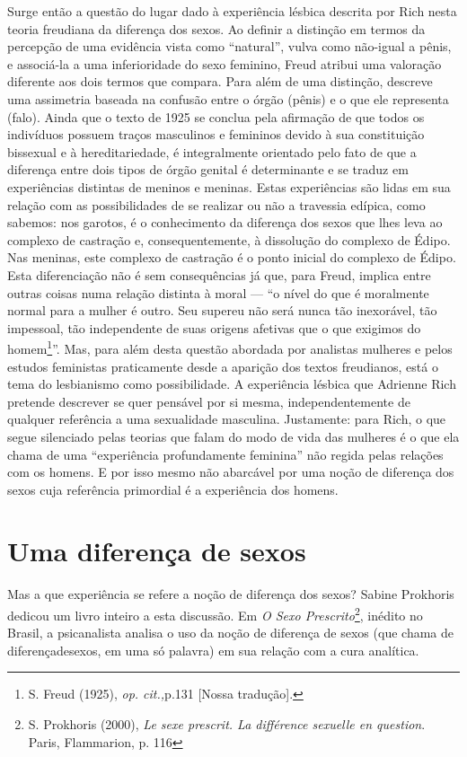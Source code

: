Surge então a questão do lugar dado à experiência lésbica descrita por
Rich nesta teoria freudiana da diferença dos sexos. Ao definir a
distinção em termos da percepção de uma evidência vista como
``natural'', vulva como não-igual a pênis, e associá-la a uma
inferioridade do sexo feminino, Freud atribui uma valoração diferente
aos dois termos que compara. Para além de uma distinção, descreve uma
assimetria baseada na confusão entre o órgão (pênis) e o que ele
representa (falo). Ainda que o texto de 1925 se conclua pela afirmação
de que todos os indivíduos possuem traços masculinos e femininos devido
à sua constituição bissexual e à hereditariedade, é integralmente
orientado pelo fato de que a diferença entre dois tipos de órgão genital
é determinante e se traduz em experiências distintas de meninos e
meninas. Estas experiências são lidas em sua relação com as
possibilidades de se realizar ou não a travessia edípica, como sabemos:
nos garotos, é o conhecimento da diferença dos sexos que lhes leva ao
complexo de castração e, consequentemente, à dissolução do complexo de
Édipo. Nas meninas, este complexo de castração é o ponto inicial do
complexo de Édipo. Esta diferenciação não é sem consequências já que,
para Freud, implica entre outras coisas numa relação distinta à moral ---
``o nível do que é moralmente normal para a mulher é outro. Seu supereu
não será nunca tão inexorável, tão impessoal, tão independente de suas
origens afetivas que o que exigimos do homem\footnote{S. Freud (1925),
  \emph{op. cit.,}p.131 {[}Nossa tradução{]}.}''. Mas, para além desta
questão abordada por analistas mulheres e pelos estudos feministas
praticamente desde a aparição dos textos freudianos, está o tema do
lesbianismo como possibilidade. A experiência lésbica que Adrienne Rich
pretende descrever se quer pensável por si mesma, independentemente de
qualquer referência a uma sexualidade masculina. Justamente: para Rich,
o que segue silenciado pelas teorias que falam do modo de vida das
mulheres é o que ela chama de uma ``experiência profundamente feminina''
não regida pelas relações com os homens. E por isso mesmo não abarcável
por uma noção de diferença dos sexos cuja referência primordial é a
experiência dos homens.

\section{Uma diferença de sexos}

Mas a que experiência se refere a noção de diferença dos sexos? Sabine
Prokhoris dedicou um livro inteiro a esta discussão. Em \emph{O Sexo
Prescrito}\footnote{S. Prokhoris (2000), \emph{Le sexe prescrit. La
  différence sexuelle en question}. Paris, Flammarion, p. 116}, inédito
no Brasil, a psicanalista analisa o uso da noção de diferença de sexos
(que chama de diferençadesexos, em uma só palavra) em sua relação com a
cura analítica.

